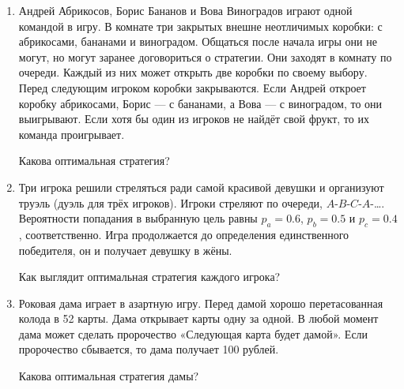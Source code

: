 \documentclass[12pt]{article}
\theoremstyle{definition}
\begin{document}
\begin{enumerate}
  \item Андрей Абрикосов, Борис Бананов и Вова Виноградов играют одной командой в игру.
  В комнате три закрытых внешне неотличимых коробки: с абрикосами, бананами и виноградом.
  Общаться после начала игры они не могут, но могут заранее договориться о стратегии.
  Они заходят в комнату по очереди.
  Каждый из них может открыть две коробки по своему выбору.
  Перед следующим игроком коробки закрываются. Если Андрей откроет коробку абрикосами,
  Борис — с бананами, а Вова — с виноградом, то они выигрывают.
  Если хотя бы один из игроков не найдёт свой фрукт, то их команда проигрывает.
  
Какова оптимальная стратегия?
  \item Три игрока решили стреляться ради самой красивой девушки и организуют труэль
  (дуэль для трёх игроков).  Игроки стреляют по очереди, $A$-$B$-$C$-$A$-\ldots.
  Вероятности попадания в выбранную цель равны $p_a=0.6$, $p_b=0.5$ и $p_c=0.4$, соответственно.
  Игра продолжается до определения единственного победителя,
  он и получает девушку в жёны.
  
  Как выглядит оптимальная стратегия каждого игрока?
  \item Роковая дама играет в азартную игру.
  Перед дамой хорошо перетасованная колода в 52 карты.
  Дама открывает карты одну за одной. В любой момент дама может
  сделать пророчество «Следующая карта будет дамой».
  Если пророчество сбывается, то дама получает 100 рублей.
  
 Какова оптимальная стратегия дамы?
  
  



\end{enumerate}
\newpage
\end{document}
